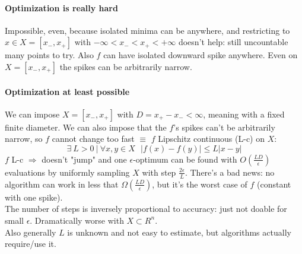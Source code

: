 \documentclass[10pt]{report}
\begin{document}
\paragraph{Optimization is really hard} Impossible, even, because isolated minima can be anywhere, and restricting to $x\in X=[x_-, x_+]$ with $-\infty<x_-<x_+<+\infty$ doesn't help: still uncountable many points to try. Also $f$ can have isolated downward spike anywhere. Even on $X = [x_-, x_+]$ the spikes can be arbitrarily narrow.
\paragraph{Optimization at least possible} We can impose $X=[x_-,x_+]$ with $D = x_+-x_-<\infty$, meaning with a fixed finite diameter. We can also impose that the $f$'s spikes can't be arbitrarily narrow, so $f$ cannot change too fast $\equiv$ $f$ Lipschitz continuous (L-c) on $X$: $$\exists\: L > 0\:|\:\forall x,y\in X\:\:\:|f(x) - f(y)| \leq L|x - y|$$
$f$ L-c $\Rightarrow$ doesn't "jump" and one $\epsilon$-optimum can be found with $O(\frac{LD}{\epsilon})$ evaluations by uniformly sampling $X$ with step $\frac{2\epsilon}{L}$. There's a bad news: no algorithm can work in less that $\Omega(\frac{LD}{\epsilon})$, but it's the worst case of $f$ (constant with one spike).\\
The number of steps is inversely proportional to accuracy: just not doable for small $\epsilon$. Dramatically worse with $X\subset R^n$.\\
Also generally $L$ is unknown and not easy to estimate, but algorithms actually require/use it.
\end{document}
